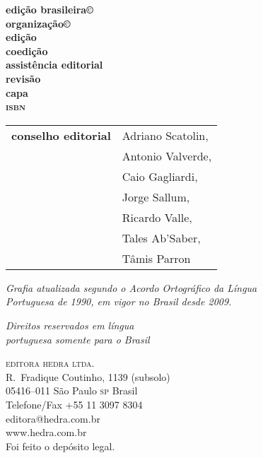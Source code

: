 \newcommand{\linha}[2]{\ifdef{#2}{\linhalayout{#1}{#2}}{}}

\begingroup\tiny
\parindent=0cm
\thispagestyle{empty}

\textbf{edição brasileira©}\\
\textbf{organização©}\\

\textbf{edição}\\
\textbf{coedição}\\
\textbf{assistência editorial}\\
\textbf{revisão}\\
\textbf{capa}\\

\textbf{\textsc{isbn}}

\hspace{-5pt}\begin{tabular}{ll}
\textbf{conselho editorial} & Adriano Scatolin,  \\
							& Antonio Valverde,  \\
							& Caio Gagliardi,    \\
							& Jorge Sallum,      \\
							& Ricardo Valle,     \\
							& Tales Ab'Saber,    \\
							& Tâmis Parron      
\end{tabular}

\bigskip
 
\textit{Grafia atualizada segundo o Acordo Ortográfico da Língua\\
Portuguesa de 1990, em vigor no Brasil desde 2009.}\\

\vfill

\textit{Direitos reservados em língua\\ 
portuguesa somente para o Brasil}\\\smallskip

\textsc{editora hedra ltda.}\\
R.~Fradique Coutinho, 1139 (subsolo)\\
05416--011 São Paulo \textsc{sp} Brasil\\
Telefone/Fax +55 11 3097 8304\\\smallskip
editora@hedra.com.br\\
www.hedra.com.br\\
\bigskip
Foi feito o depósito legal.

\endgroup
\pagebreak